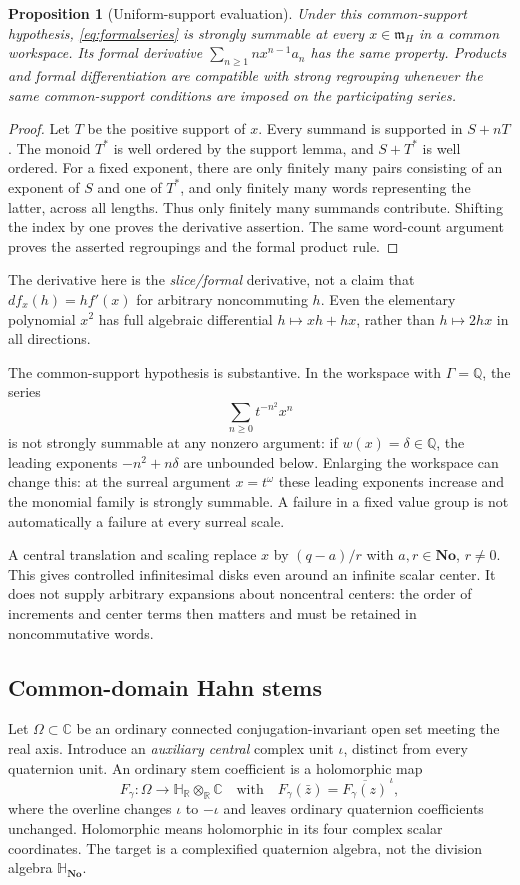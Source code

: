 \documentclass[11pt,letterpaper]{article}
\numberwithin{equation}{section}
\newtheorem{proposition}[proposition]{Proposition}
\theoremstyle{definition}
\theoremstyle{remark}
\newcommand{\No}{\mathbf{No}}
\newcommand{\SQ}{\mathbb H_{\No}}
\newcommand{\HR}{\mathbb H_{\mathbb R}}
\newcommand{\R}{\mathbb R}
\newcommand{\C}{\mathbb C}
\newcommand{\Q}{\mathbb Q}
\newcommand{\mm}{\mathfrak m}
\begin{document}
\begin{proposition}[Uniform-support evaluation]\label{prop:evaluation}
Under this common-support hypothesis, \eqref{eq:formalseries} is strongly summable at every
$x\in\mm_H$ in a common workspace. Its formal derivative
$\sum_{n\ge1}nx^{n-1}a_n$ has the same property. Products and formal differentiation are
compatible with strong regrouping whenever the same common-support conditions are imposed
on the participating series.
\end{proposition}
\begin{proof}
Let $T$ be the positive support of $x$. Every summand is supported in $S+nT$. The monoid
$T^*$ is well ordered by the support lemma, and $S+T^*$ is well ordered. For a fixed exponent,
there are only finitely many pairs consisting of an exponent of $S$ and one of $T^*$, and
only finitely many words representing the latter, across all lengths. Thus only finitely many
summands contribute. Shifting the index by one proves the derivative assertion. The same
word-count argument proves the asserted regroupings and the formal product rule.
\end{proof}

The derivative here is the \emph{slice/formal} derivative, not a claim that
$df_x(h)=hf'(x)$ for arbitrary noncommuting $h$. Even the elementary polynomial $x^2$ has
full algebraic differential $h\mapsto xh+hx$, rather than $h\mapsto2hx$ in all directions.

The common-support hypothesis is substantive. In the workspace with $\Gamma=\Q$, the
series
\[
 \sum_{n\ge0}t^{-n^2}x^n
\]
is not strongly summable at any nonzero argument: if $w(x)=\delta\in\Q$, the leading
exponents $-n^2+n\delta$ are unbounded below. Enlarging the workspace can change this:
at the surreal argument $x=t^\omega$ these leading exponents increase and the monomial
family is strongly summable. A failure in a fixed value group is not automatically a failure
at every surreal scale.

A central translation and scaling replace $x$ by $(q-a)/r$ with $a,r\in\No$, $r\ne0$.
This gives controlled infinitesimal disks even around an infinite scalar center. It does not
supply arbitrary expansions about noncentral centers: the order of increments and center
terms then matters and must be retained in noncommutative words.

\subsection{Common-domain Hahn stems}
Let $\Omega\subset\C$ be an ordinary connected conjugation-invariant open set meeting the
real axis. Introduce an \emph{auxiliary central} complex unit $\iota$, distinct from every
quaternion unit. An ordinary stem coefficient is a holomorphic map
\[
 F_\gamma:\Omega\to\HR\otimes_\R\C
 \quad\text{with}\quad
 F_\gamma(\bar z)=\overline{F_\gamma(z)}^{\,\iota},
\]
where the overline changes $\iota$ to $-\iota$ and leaves ordinary quaternion coefficients
unchanged. Holomorphic means holomorphic in its four complex scalar coordinates.
The target is a complexified quaternion algebra, not the division algebra $\SQ$.
\end{document}
